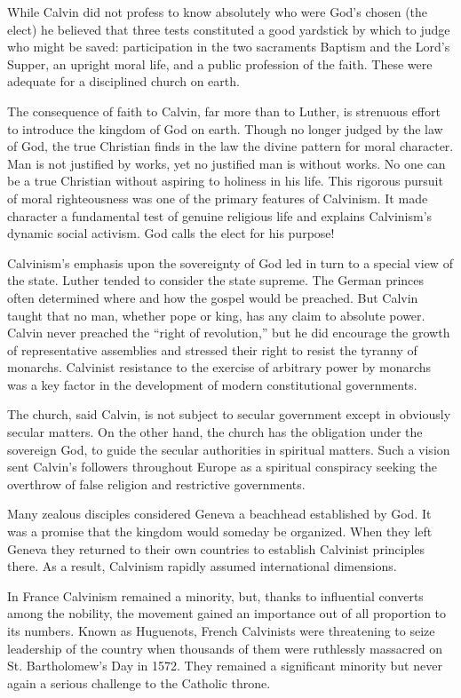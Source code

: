 While Calvin did not profess to know absolutely who were God’s chosen (the elect) he believed that
three tests constituted a good yardstick by which to judge who might be saved: participation in the
two sacraments Baptism and the Lord’s Supper, an upright moral life, and a public profession of the
faith. These were adequate for a disciplined church on earth.

The consequence of faith to Calvin, far more than to Luther, is strenuous effort to introduce the
kingdom of God on earth. Though no longer judged by the law of God, the true Christian finds in the
law the divine pattern for moral character. Man is not justified by works, yet no justified man is
without works. No one can be a true Christian without aspiring to holiness in his life. This
rigorous pursuit of moral righteousness was one of the primary features of Calvinism. It made
character a fundamental test of genuine religious life and explains Calvinism’s dynamic social
activism. God calls the elect for his purpose!

Calvinism’s emphasis upon the sovereignty of God led in turn to a special view of the state. Luther
tended to consider the state supreme. The German princes often determined where and how the gospel
would be preached. But Calvin taught that no man, whether pope or king, has any claim to absolute
power. Calvin never preached the “right of revolution,” but he did encourage the growth of
representative assemblies and stressed their right to resist the tyranny of monarchs. Calvinist
resistance to the exercise of arbitrary power by monarchs was a key factor in the development of
modern constitutional governments.

The church, said Calvin, is not subject to secular government except in obviously secular matters.
On the other hand, the church has the obligation under the sovereign God, to guide the secular
authorities in spiritual matters. Such a vision sent Calvin’s followers throughout Europe as a
spiritual conspiracy seeking the overthrow of false religion and restrictive governments.

Many zealous disciples considered Geneva a beachhead established by God. It was a promise that the
kingdom would someday be organized. When they left Geneva they returned to their own countries to
establish Calvinist principles there. As a result, Calvinism rapidly assumed international
dimensions.

In France Calvinism remained a minority, but, thanks to influential converts among the nobility, the
movement gained an importance out of all proportion to its numbers. Known as Huguenots, French
Calvinists were threatening to seize leadership of the country when thousands of them were
ruthlessly massacred on St. Bartholomew’s Day in 1572. They remained a significant minority but
never again a serious challenge to the Catholic throne.

